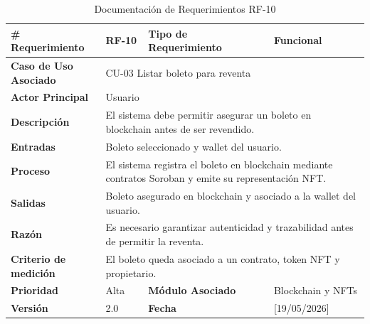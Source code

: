 \documentclass[12pt,letterpaper]{article}
\begin{document}
\begin{table}[H]
\centering
\scriptsize
\renewcommand{\arraystretch}{1.05}
\setlength{\tabcolsep}{3pt}

\newlength{\anchoceldaRFdiez}
\setlength{\anchoceldaRFdiez}{\dimexpr\textwidth-2.7cm-8\tabcolsep-5\arrayrulewidth\relax}

\begin{tabularx}{\textwidth}{|p{2.7cm}|X|p{2.8cm}|X|}
\hline
\textbf{\# Requerimiento} & RF-10 & \textbf{Tipo de Requerimiento} & Funcional \\ \hline

\textbf{Caso de Uso Asociado} & 
\multicolumn{3}{p{\anchoceldaRFdiez}|}{CU-03 Listar boleto para reventa} \\ \hline

\textbf{Actor Principal} & 
\multicolumn{3}{p{\anchoceldaRFdiez}|}{Usuario} \\ \hline

\textbf{Descripción} & 
\multicolumn{3}{p{\anchoceldaRFdiez}|}{El sistema debe permitir asegurar un boleto en blockchain antes de ser revendido.} \\ \hline

\textbf{Entradas} & 
\multicolumn{3}{p{\anchoceldaRFdiez}|}{Boleto seleccionado y wallet del usuario.} \\ \hline

\textbf{Proceso} & 
\multicolumn{3}{p{\anchoceldaRFdiez}|}{El sistema registra el boleto en blockchain mediante contratos Soroban y emite su representación NFT.} \\ \hline

\textbf{Salidas} & 
\multicolumn{3}{p{\anchoceldaRFdiez}|}{Boleto asegurado en blockchain y asociado a la wallet del usuario.} \\ \hline

\textbf{Razón} & 
\multicolumn{3}{p{\anchoceldaRFdiez}|}{Es necesario garantizar autenticidad y trazabilidad antes de permitir la reventa.} \\ \hline

\textbf{Criterio de medición} & 
\multicolumn{3}{p{\anchoceldaRFdiez}|}{El boleto queda asociado a un contrato, token NFT y propietario.} \\ \hline

\textbf{Prioridad} & Alta & \textbf{Módulo Asociado} & Blockchain y NFTs \\ \hline

\textbf{Versión} & 2.0 & \textbf{Fecha} & [19/05/2026] \\ \hline

\end{tabularx}

\caption{Documentación de Requerimientos RF-10}
\label{tab:documentacion_requerimientos_rf10}
\normalsize
\end{table}
\end{document}
